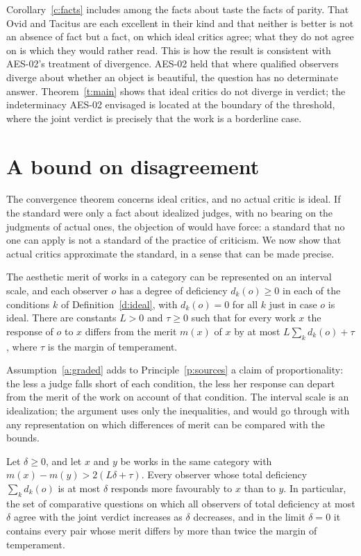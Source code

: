 \documentclass{situationist-preprint}
\begin{document}
Corollary~\ref{c:facts} includes among the facts about taste the facts of parity. That Ovid and Tacitus are each excellent in their kind and that neither is better is not an absence of fact but a fact, on which ideal critics agree; what they do not agree on is which they would rather read. This is how the result is consistent with AES-02's treatment of divergence. AES-02 held that where qualified observers diverge about whether an object is beautiful, the question has no determinate answer. Theorem~\ref{t:main} shows that ideal critics do not diverge in verdict; the indeterminacy AES-02 envisaged is located at the boundary of the threshold, where the joint verdict is precisely that the work is a borderline case.

\section{A bound on disagreement}\label{s:bound}

The convergence theorem concerns ideal critics, and no actual critic is ideal. If the standard were only a fact about idealized judges, with no bearing on the judgments of actual ones, the objection of \citet{Ross2008} would have force: a standard that no one can apply is not a standard of the practice of criticism. We now show that actual critics approximate the standard, in a sense that can be made precise.

\begin{assumption}\label{a:graded}
The aesthetic merit of works in a category can be represented on an interval scale, and each observer $o$ has a degree of deficiency $d_k(o)\ge 0$ in each of the conditions $k$ of Definition~\ref{d:ideal}, with $d_k(o)=0$ for all $k$ just in case $o$ is ideal. There are constants $L>0$ and $\tau\ge 0$ such that for every work $x$ the response of $o$ to $x$ differs from the merit $m(x)$ of $x$ by at most $L\sum_k d_k(o)+\tau$, where $\tau$ is the margin of temperament.
\end{assumption}

Assumption~\ref{a:graded} adds to Principle~\ref{p:sources} a claim of proportionality: the less a judge falls short of each condition, the less her response can depart from the merit of the work on account of that condition. The interval scale is an idealization; the argument uses only the inequalities, and would go through with any representation on which differences of merit can be compared with the bounds.

\begin{proposition}\label{p:approx}
Let $\delta\ge 0$, and let $x$ and $y$ be works in the same category with $m(x)-m(y)>2(L\delta+\tau)$. Every observer whose total deficiency $\sum_k d_k(o)$ is at most $\delta$ responds more favourably to $x$ than to $y$. In particular, the set of comparative questions on which all observers of total deficiency at most $\delta$ agree with the joint verdict increases as $\delta$ decreases, and in the limit $\delta=0$ it contains every pair whose merit differs by more than twice the margin of temperament.
\end{proposition}
\end{document}
